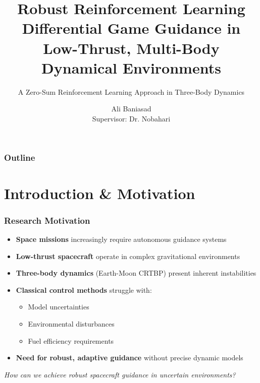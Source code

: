 \documentclass[
    11pt, %
    aspectratio=169, %
]{beamer}
\title[Multi-Agent RL for Spacecraft Guidance]{Robust Reinforcement Learning Differential Game Guidance in Low-Thrust, Multi-Body Dynamical Environments}
\subtitle{A Zero-Sum Reinforcement Learning Approach in Three-Body Dynamics}
\author[Ali Baniasad]{Ali Baniasad \\ \smallskip Supervisor: Dr. Nobahari}
\institute[]{Department of Aerospace Engineering \\ \smallskip Sharif University of Technology}
\date[\today]
\begin{document}
\section{}
\begin{frame}
	\titlepage %

\end{frame}


\begin{frame}
	\frametitle{Outline}

	\tableofcontents
\end{frame}


\section{Introduction \& Motivation}

\begin{frame}
	\frametitle{Research Motivation}
	
	\begin{itemize}
		\item \textbf{Space missions} increasingly require autonomous guidance systems
		\item \textbf{Low-thrust spacecraft} operate in complex gravitational environments
		\item \textbf{Three-body dynamics} (Earth-Moon CRTBP) present inherent instabilities
		\item \textbf{Classical control methods} struggle with:
		\begin{itemize}
			\item Model uncertainties
			\item Environmental disturbances
			\item Fuel efficiency requirements
		\end{itemize}
		\item \textbf{Need for robust, adaptive guidance} without precise dynamic models
	\end{itemize}
	
	\vspace{0.3cm}
	\begin{center}
		\textit{How can we achieve robust spacecraft guidance in uncertain environments?}
	\end{center}
\end{frame}
\end{document}

